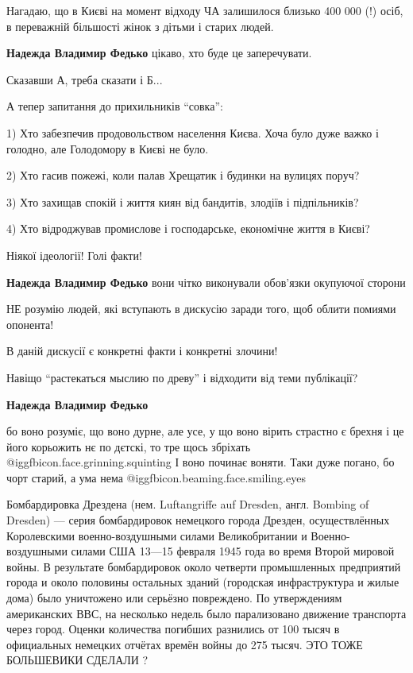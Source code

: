 \begin{itemize}
Нагадаю, що в Києві на момент відходу ЧА залишилося близько 400 000 (!) осіб, в
переважній більшості жінок з дітьми і старих людей.

\textbf{Надежда Владимир Федько} цікаво, хто буде це заперечувати.


Сказавши А, треба сказати і Б...

А тепер запитання до прихильників \enquote{совка}:

1) Хто забезпечив продовольством населення Києва. Хоча було дуже важко і
голодно, але Голодомору в Києві не було.

2) Хто гасив пожежі, коли палав Хрещатик і будинки на вулицях поруч?

3) Хто захищав спокій і життя киян від бандитів, злодіїв і підпільників?

4) Хто відроджував промислове і господарське, економічне життя в Києві?

\begin{itemize} %

Ніякої ідеології! Голі факти!

\textbf{Надежда Владимир Федько} вони чітко виконували обов'язки окупуючої сторони
\end{itemize} %


НЕ розумію людей, які вступають в дискусію заради того, щоб облити помиями
опонента!

В даній дискусії є конкретні факти і конкретні злочини!

Навіщо \enquote{растекаться мыслию по древу} і відходити від теми публікації?

\begin{itemize} %
\textbf{Надежда Владимир Федько} 

бо воно розуміє, що воно дурне, але усе, у що воно вірить страстно є брехня і це його корьожить нє по дєтскі, то тре щось збріхать  @igg{fbicon.face.grinning.squinting} 
І воно починає воняти.
Таки дуже погано, бо чорт старий, а ума нема  @igg{fbicon.beaming.face.smiling.eyes} 
\end{itemize} %


Бомбардировка Дрездена (нем. Luftangriffe auf Dresden, англ. Bombing of
Dresden) — серия бомбардировок немецкого города Дрезден, осуществлённых
Королевскими военно-воздушными силами Великобритании и Военно-воздушными силами
США 13—15 февраля 1945 года во время Второй мировой войны. В результате
бомбардировок около четверти промышленных предприятий города и около половины
остальных зданий (городская инфраструктура и жилые дома) было уничтожено или
серьёзно повреждено. По утверждениям американских ВВС, на несколько недель было
парализовано движение транспорта через город. Оценки количества погибших
разнились от 100 тысяч в официальных немецких отчётах времён войны до 275
тысяч. ЭТО ТОЖЕ БОЛЬШЕВИКИ СДЕЛАЛИ ?


\end{itemize}
